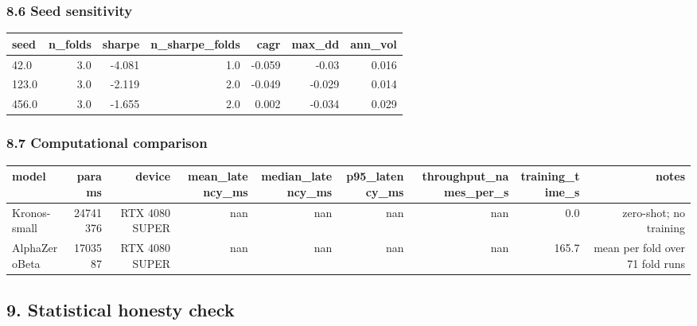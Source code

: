\subsubsection*{8.6 Seed sensitivity}

\begin{center}\footnotesize\begin{longtable}{lrrrrrr}
\toprule
seed & n\_folds & sharpe & n\_sharpe\_folds & cagr & max\_dd & ann\_vol \\
\midrule
42.0 & 3.0 & -4.081 & 1.0 & -0.059 & -0.03 & 0.016 \\
123.0 & 3.0 & -2.119 & 2.0 & -0.049 & -0.029 & 0.014 \\
456.0 & 3.0 & -1.655 & 2.0 & 0.002 & -0.034 & 0.029 \\
\bottomrule
\end{longtable}\end{center}

\subsubsection*{8.7 Computational comparison}

\begin{center}\footnotesize\begin{longtable}{lrrrrrrrr}
\toprule
model & params & device & mean\_latency\_ms & median\_latency\_ms & p95\_latency\_ms & throughput\_names\_per\_s & training\_time\_s & notes \\
\midrule
Kronos-small & 24741376 & RTX 4080 SUPER & nan & nan & nan & nan & 0.0 & zero-shot; no training \\
AlphaZeroBeta & 1703587 & RTX 4080 SUPER & nan & nan & nan & nan & 165.7 & mean per fold over 71 fold runs \\
\bottomrule
\end{longtable}\end{center}

\subsection*{9. Statistical honesty check}

